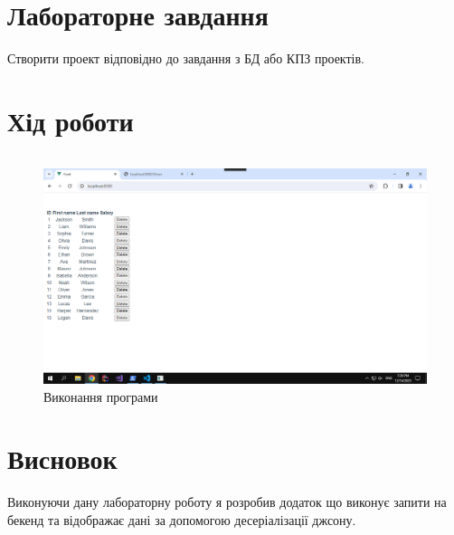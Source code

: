 \documentclass[14pt]{extreport}
\begin{document}
\begin{normalsize}
	\section*{Лабораторне завдання}
	Створити проект відповідно до завдання з БД або КПЗ проектів. 
	
	\section*{Хід роботи}
	
	\begin{small}
		\begin{lstlisting}
		\end{lstlisting}
	\end{small}
	
	\begin{figure}[H]
		\centering
		\includegraphics[scale=0.6]{1}
		\caption{Виконання програми}
	\end{figure}
	
	
	\section*{Висновок}
	Виконуючи дану лабораторну роботу я розробив додаток що виконує запити на бекенд та відображає дані за допомогою десеріалізації джсону.
	
	
	 
\end{normalsize}
\end{document}
